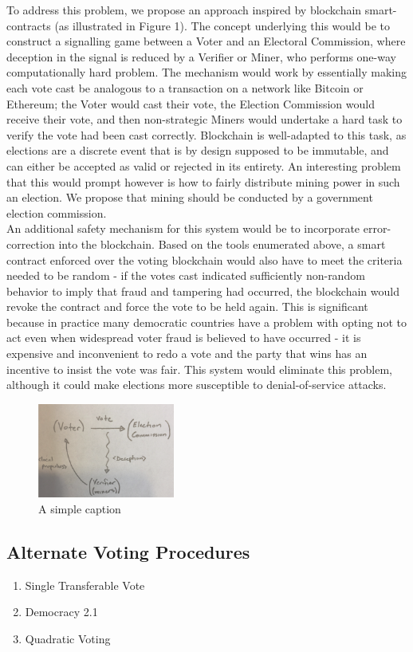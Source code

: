 \documentclass[a4paper]{article}
\begin{document}
To address this problem, we propose an approach inspired by blockchain smart-contracts (as illustrated in Figure 1). The concept underlying this would be to construct a signalling game between a Voter and an Electoral Commission, where deception in the signal is reduced by a Verifier or Miner, who performs one-way computationally hard problem. The mechanism would work by essentially making each vote cast be analogous to a transaction on a network like Bitcoin or Ethereum; the Voter would cast their vote, the Election Commission would receive their vote, and then non-strategic Miners would undertake a hard task to verify the vote had been cast correctly. Blockchain is well-adapted to this task, as elections are a discrete event that is by design supposed to be immutable, and can either be accepted as valid or rejected in its entirety. An interesting problem that this would prompt however is how to fairly distribute mining power in such an election. We propose that mining should be conducted by a government election commission. \\

An additional safety mechanism for this system would be to incorporate error-correction into the blockchain. Based on the tools enumerated above, a smart contract enforced over the voting blockchain would also have to meet the criteria needed to be random - if the votes cast indicated sufficiently non-random behavior to imply that fraud and tampering had occurred, the blockchain would revoke the contract and force the vote to be held again. This is significant because in practice many democratic countries have a problem with opting not to act even when widespread voter fraud is believed to have occurred - it is expensive and inconvenient to redo a vote and the party that wins has an incentive to insist the vote was fair. This system would eliminate this problem, although it could make elections more susceptible to denial-of-service attacks.
\begin{figure}[h!]
\centering
\includegraphics[width=45mm]{votechain.png}
\caption{A simple caption \label{overflow}}
\end{figure}

\subsection{Alternate Voting Procedures}
\begin{enumerate}
\item Single Transferable Vote
\item Democracy 2.1
\item Quadratic Voting

\end{enumerate}
\end{document}
